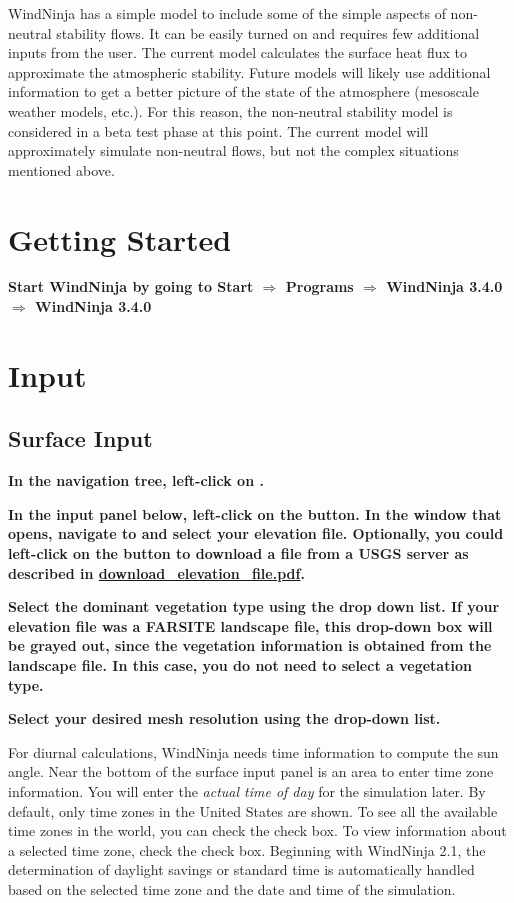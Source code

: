 \documentclass[12pt]{article}
\newcommand\vn{3.4.0}
\begin{document}
WindNinja has a simple model to include some of the simple aspects of non-neutral stability flows.  It can be easily turned on and requires few additional inputs from the user.  The current model calculates the surface heat flux to approximate the atmospheric stability.  Future models will likely use additional information to get a better picture of the state of the atmosphere (mesoscale weather models, etc.).  For this reason, the non-neutral stability model is considered in a beta test phase at this point.  The current model will approximately simulate non-neutral flows, but not the complex situations mentioned above.

\section{Getting Started}

\textbf{\color{red}Start WindNinja by going to Start $\Rightarrow$ Programs $\Rightarrow$ WindNinja \vn\ $\Rightarrow$ WindNinja \vn\ }

\section{Input}
\subsection{Surface Input}

\textbf{\color{red} In the navigation tree, left-click on .}


\textbf{\color{red} In the input panel below, left-click on the  button.  In the window that opens, navigate to and select your elevation file.  Optionally, you could left-click on the  button to download a file from a USGS server as described in \href{http://firelab.github.io/windninja/pdf/download_elevation_file.pdf}{download\_elevation\_file.pdf}.}

\textbf{\color{red} Select the dominant vegetation type using the  drop down list.  If your elevation file was a FARSITE landscape file, this drop-down box will be grayed out, since the vegetation information is obtained from the landscape file.  In this case, you do not need to select a vegetation type.}

\textbf{\color{red}
Select your desired mesh resolution using the  drop-down list.}

For diurnal calculations, WindNinja needs time information to compute the sun angle.  Near the bottom of the surface input panel is an area to enter time zone information.  You will enter the \textit{actual time of day} for the simulation later.  By default, only time zones in the United States are shown.  To see all the available time zones in the world, you can check the  check box.  To view information about a selected time zone, check the  check box.  Beginning with WindNinja 2.1, the determination of daylight savings or standard time is automatically handled based on the selected time zone and the date and time of the simulation.
\end{document}
